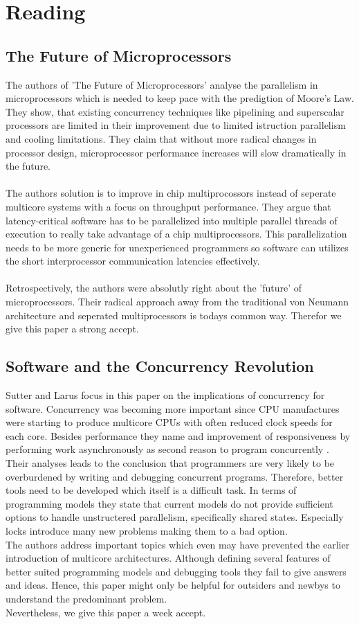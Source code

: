 \documentclass{article}
\newcommand{\enterProblemHeader}[1]{
}
\newcommand{\exitProblemHeader}[1]{
}
\newcounter{homeworkProblemCounter} %
\newcommand{\homeworkProblemName}{}
\newenvironment{homeworkProblem}[1][Problem \arabic{homeworkProblemCounter}]{ %
\stepcounter{homeworkProblemCounter} %
\renewcommand{\homeworkProblemName}{#1} %
\section{\homeworkProblemName} %
}{
}
\begin{document}
\begin{homeworkProblem}[Reading]

\subsection{The Future of Microprocessors}
The authors of 'The Future of Microprocessors' analyse the parallelism in microprocessors
which is needed to keep pace with the predigtion of Moore's Law. They show, that existing
concurrency techniques like pipelining and superscalar processors are limited in their
improvement due to limited istruction parallelism and cooling limitations. They claim
that without more radical changes in processor design, microprocessor performance increases
will slow dramatically in the future.
\\\\
The authors solution is to improve in chip multiprocossors instead of seperate multicore
systems with a focus on throughput performance. They argue that latency-critical software 
has to be parallelized into multiple parallel threads of execution to really take 
advantage of a chip multiprocessors. This parallelization needs to be more generic for
unexperienced programmers so software can utilizes the short interprocessor communication
latencies effectively.
\\\\
Retrospectively, the authors were absolutly right about the 'future' of microprocessors. 
Their radical approach away from the traditional von Neumann architecture and seperated
multiprocessors is todays common way. Therefor we give this paper a strong accept.
\subsection{Software and the Concurrency Revolution}
Sutter and Larus focus in this paper on the implications of concurrency for software. Concurrency was becoming more important since CPU manufactures were starting to produce multicore CPUs with often reduced clock speeds for each core. Besides performance they name and improvement of responsiveness by performing work asynchronously as second reason to program concurrently . \\
Their analyses leads to the conclusion that programmers are very likely to be overburdened by writing and debugging concurrent programs. Therefore, better tools need to be developed which itself is a difficult task. In terms of programming models they state that current models do not provide sufficient options to handle unstructered parallelism, specifically shared states. Especially locks introduce many new problems making them to a bad option. \\
The authors address important topics which even may have prevented the earlier introduction of multicore architectures. Although defining several features of better suited programming models and debugging tools they fail to give answers and ideas. Hence, this paper might only be helpful for outsiders and newbys to understand the predominant problem. \\
Nevertheless, we give this paper a week accept.\\


\end{homeworkProblem}
\end{document}
